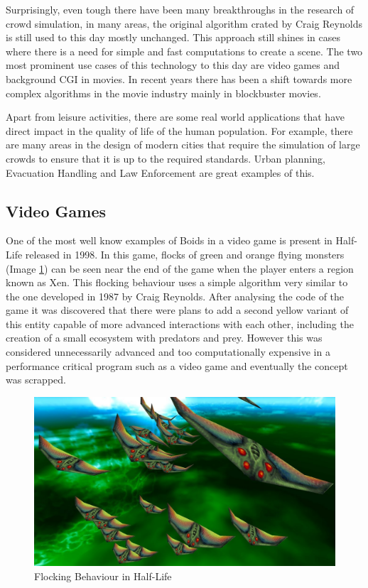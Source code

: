 \documentclass[sigconf]{acmart}
\begin{document}
Surprisingly, even tough there have been many breakthroughs in the research of  crowd
simulation, in many areas, the original algorithm crated by Craig Reynolds is still used
to this day mostly unchanged. This approach still shines in cases where there is a need
for simple and fast computations to create a scene. The two most prominent use cases of
this technology to this day are video games and background CGI in movies. In
recent years there has been a shift towards more complex algorithms in the movie
industry mainly in blockbuster movies.

Apart from leisure activities, there are some real world applications that have direct impact
in the quality of life of the human population. For example, there are many areas in the design
of modern cities that require the simulation of large crowds to ensure that it is up to the
required standards. Urban planning, Evacuation Handling and Law Enforcement are great examples of this.

\subsection{Video Games}

One of the most well know examples of Boids in a video game is present in Half-Life
released in 1998. In this game, flocks of green and orange flying monsters (Image
\ref{fig:halfLifeBoid}) can be seen near the end of the game when the player enters
a region known as Xen. This flocking behaviour uses a simple algorithm very similar to the
one developed in 1987 by Craig Reynolds\cite{Half-LifeWiki}. After
analysing the code of the game it was discovered that there were plans to add a second
yellow variant of this entity capable of more advanced interactions with each other, including
the creation of a small ecosystem with predators and prey. However this was considered
unnecessarily advanced and too computationally expensive in a performance critical program
such as a video game and eventually the concept was scrapped.

\begin{figure}[h]
  \centering
  \includegraphics[width=0.95\linewidth]{images/half-life_boids.jpg}
  \caption{Flocking Behaviour in Half-Life}
  \label{fig:halfLifeBoid}
\end{figure}
\end{document}
